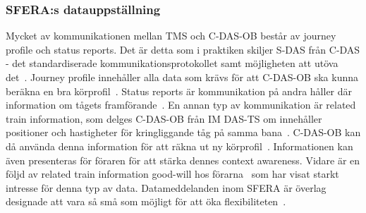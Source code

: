 \subsubsection{SFERA:s datauppställning}
Mycket av kommunikationen mellan TMS och C-DAS-OB består av journey profile och status reports.
Det är detta som i praktiken skiljer S-DAS från C-DAS - det standardiserade kommunikationsprotokollet samt möjligheten att utöva det~\cite{IRS90940}.
Journey profile innehåller alla data som krävs för att C-DAS-OB ska kunna beräkna en bra körprofil~\cite{IRS90940}.
Status reports är kommunikation på andra håller där information om tågets framförande~\cite{IRS90940}.
En annan typ av kommunikation är related train information, som delges C-DAS-OB från IM DAS-TS om innehåller positioner och hastigheter för kringliggande tåg på samma bana~\cite{IRS90940}.
C-DAS-OB kan då använda denna information för att räkna ut ny körprofil~\cite{IRS90940}.
Informationen kan även presenteras för föraren för att stärka dennes context awareness.
Vidare är en följd av related train information good-will hos förarna~\cite{IRS90940} som har visat starkt intresse för denna typ av data.
Datameddelanden inom SFERA är överlag designade att vara så små som möjligt för att öka flexibiliteten~\cite{IRS90940}.
